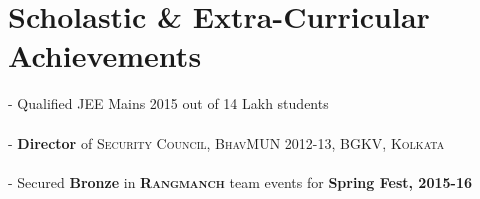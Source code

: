 \documentclass[a4paper,11pt]{extarticle} %
\begin{document}
\section{Scholastic \& Extra-Curricular Achievements}

{\hspace{0.5cm}- Qualified JEE Mains 2015 out of 14 Lakh students}\\ \hspace*{0.5cm}{- Qualified JEE Advanced 2015 out of 5 Lakh students}\\
{\hspace*{0.5cm}- \textbf{Director} of \textsc{Security Council, BhavMUN 2012-13, BGKV, Kolkata}}\\
\\
{\hspace*{0.5cm}- Secured \textbf{Bronze} in \textsc{\textbf{Rangmanch}} team events for \textbf{Spring Fest, 2015-16}}



\end{document}
